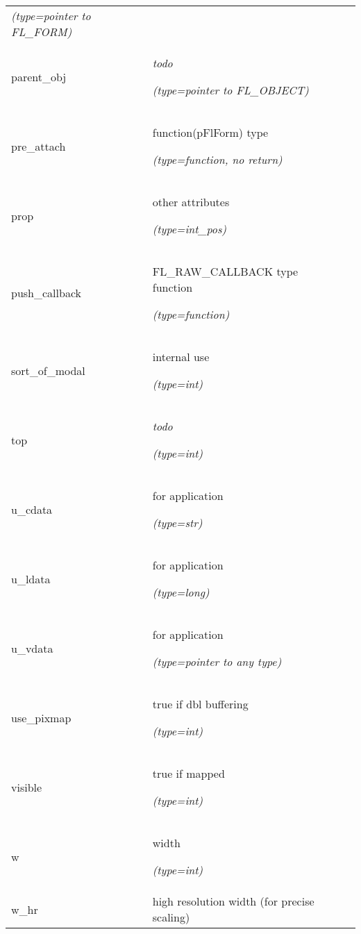 \begin{longtable}{|p{\varnamewidth}|p{\vardescrwidth}|l}
            {\it (type=pointer to FL\_FORM)}&\\
\cline{1-2}
\raggedright p\-a\-r\-e\-n\-t\-\_\-o\-b\-j\- & \raggedright \emph{todo}

            {\it (type=pointer to FL\_OBJECT)}&\\
\cline{1-2}
\raggedright p\-r\-e\-\_\-a\-t\-t\-a\-c\-h\- & \raggedright function(pFlForm) type

            {\it (type=function, no return)}&\\
\cline{1-2}
\raggedright p\-r\-o\-p\- & \raggedright other attributes

            {\it (type=int\_pos)}&\\
\cline{1-2}
\raggedright p\-u\-s\-h\-\_\-c\-a\-l\-l\-b\-a\-c\-k\- & \raggedright FL\_RAW\_CALLBACK type function

            {\it (type=function)}&\\
\cline{1-2}
\raggedright s\-o\-r\-t\-\_\-o\-f\-\_\-m\-o\-d\-a\-l\- & \raggedright internal use

            {\it (type=int)}&\\
\cline{1-2}
\raggedright t\-o\-p\- & \raggedright \emph{todo}

            {\it (type=int)}&\\
\cline{1-2}
\raggedright u\-\_\-c\-d\-a\-t\-a\- & \raggedright for application

            {\it (type=str)}&\\
\cline{1-2}
\raggedright u\-\_\-l\-d\-a\-t\-a\- & \raggedright for application

            {\it (type=long)}&\\
\cline{1-2}
\raggedright u\-\_\-v\-d\-a\-t\-a\- & \raggedright for application

            {\it (type=pointer to any type)}&\\
\cline{1-2}
\raggedright u\-s\-e\-\_\-p\-i\-x\-m\-a\-p\- & \raggedright true if dbl buffering

            {\it (type=int)}&\\
\cline{1-2}
\raggedright v\-i\-s\-i\-b\-l\-e\- & \raggedright true if mapped

            {\it (type=int)}&\\
\cline{1-2}
\raggedright w\- & \raggedright width

            {\it (type=int)}&\\
\cline{1-2}
\raggedright w\-\_\-h\-r\- & \raggedright high resolution width (for precise scaling)


\end{longtable}
